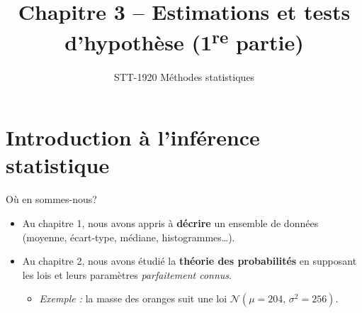 \documentclass{BeamerTemplate}
\title{Chapitre 3 -- Estimations et tests d'hypothèse (1\textsuperscript{re} partie)}
\subtitle{STT-1920 Méthodes statistiques}
\date{}
\begin{document}
\begin{frame}[t]
  \titlepage
\end{frame}

\section{Introduction à l'inférence statistique}

\begin{frame}[t]{Où en sommes-nous?}
  \begin{itemize}\itemsep 4mm
    \item Au \alert{chapitre 1}, nous avons appris à \textbf{décrire} un ensemble de données (moyenne, écart-type, médiane, histogrammes\ldots).
    \item Au \alert{chapitre 2}, nous avons étudié la \textbf{théorie des probabilités} en supposant les lois et leurs paramètres \emph{parfaitement connus}.
    \begin{itemize}
      \item \emph{Exemple :} la masse des oranges suit une loi $\mathcal{N}(\mu = 204,\, \sigma^2 = 256)$.
    \end{itemize}
  \end{itemize}

  \bigskip

  \medskip
\end{frame}
\end{document}
